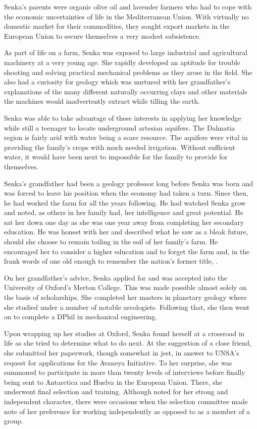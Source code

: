 Senka's parents were organic olive oil and lavender farmers who had to cope with the economic uncertainties of life in the Mediterranean Union. With virtually no domestic market for their commodities, they sought export markets in the European Union to secure themselves a very modest subsistence.

As part of life on a farm, Senka was exposed to large industrial and agricultural machinery at a very young age. She rapidly developed an aptitude for trouble shooting and solving practical mechanical problems as they arose in the field. She also had a curiosity for geology which was nurtured with her grandfather's explanations of the many different naturally occurring clays and other materials the machines would inadvertently extract while tilling the earth. 

Senka was able to take advantage of these interests in applying her knowledge while still a teenager to locate underground artesian aquifers. The Dalmatia region is fairly arid with water being a scare resource. The aquifers were vital in providing the family's crops with much needed irrigation. Without sufficient water, it would have been next to impossible for the family to provide for themselves.

Senka's grandfather had been a geology professor long before Senka was born and was forced to leave his position when the economy had taken a turn. Since then, he had worked the farm for all the years following. He had watched Senka grow and noted, as others in her family had, her intelligence and great potential. He sat her down one day as she was one year away from completing her secondary education. He was honest with her and described what he saw as a bleak future, should she choose to remain toiling in the soil of her family's farm. He encouraged her to consider a higher education and to forget the farm and, in the frank words of one old enough to remember the nation's former title, .

On her grandfather's advice, Senka applied for and was accepted into the University of Oxford's Merton College. This was made possible almost solely on the basis of scholarships. She completed her masters in planetary geology where she studied under a number of notable areologists. Following that, she then went on to complete a DPhil in mechanical engineering.

Upon wrapping up her studies at Oxford, Senka found herself at a crossroad in life as she tried to determine what to do next. At the suggestion of a close friend, she submitted her paperwork, though somewhat in jest, in answer to UNSA's request for applications for the Avaneya Initiative. To her surprise, she was summoned to participate in more than twenty levels of interviews before finally being sent to Antarctica and Huelva in the European Union. There, she underwent final selection and training. Although noted for her strong and independent character, there were occasions when the selection committee made note of her preference for working independently as opposed to as a member of a group.

